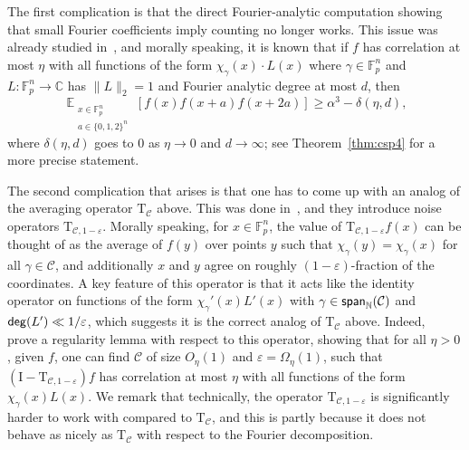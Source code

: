 \documentclass[11pt]{article}
\newcommand\norm[1]{\| #1 \|}
\newcommand\Expect[2]{{\mathop{\mathbb{E}}_{#1}\left[ {#2} \right]}}
\newcommand\spn{{\sf span}_{\mathbb{N}}}
\newcommand\eps{\varepsilon}
\renewcommand\geq{\geqslant}
\begin{document}
The first complication is that the direct Fourier-analytic computation showing that small Fourier coefficients imply counting no longer works.
This issue was already studied in~\cite{BKM3AP,BKM4}, and morally speaking, it is known that if $f$ has correlation at most $\eta$ with all functions of the form $\chi_{\gamma}(x)\cdot L(x)$ 
where $\gamma\in\mathbb{F}_p^n$ and $L\colon \mathbb{F}_p^n\to\mathbb{C}$ has $\norm{L}_2=1$ and Fourier analytic degree at most $d$, then
\[
\Expect{\substack{x\in\mathbb{F}_p^n\\a\in\{0,1,2\}^n}}{f(x)f(x+a)f(x+2a)}
\geq \alpha^3 - \delta(\eta,d),
\]
where $\delta(\eta,d)$ goes to $0$ as $\eta\rightarrow 0$ and $d\rightarrow \infty$; see Theorem~\ref{thm:csp4} for a more precise statement. 


The second complication that arises is that one has to come up with an analog of the averaging operator $\mathrm{T}_{\mathcal{C}}$ above. This was done in~\cite{BKM5}, and they introduce noise operators $\mathrm{T}_{\mathcal{C},1-\eps}$. Morally speaking, for $x\in\mathbb{F}_p^n$, the value of $\mathrm{T}_{\mathcal{C},1-\eps}f(x)$ can be thought of as the average of $f(y)$ over points $y$ such that $\chi_{\gamma}(y) = \chi_{\gamma}(x)$ for all $\gamma\in\mathcal{C}$, and additionally $x$ and $y$ agree on roughly $(1-\eps)$-fraction of the coordinates. A key feature of this  operator is that it acts like the identity operator on functions of the form $\chi_{\gamma}'(x) L'(x)$ with $\gamma\in \spn(\mathcal{C})$ and ${\sf deg}(L')\ll 1/\eps$, which suggests it is the correct analog of $\mathrm{T}_{\mathcal{C}}$ above. Indeed,~\cite{BKM5} prove a regularity lemma with respect to this operator, showing that for all $\eta>0$, given $f$, one can find 
$\mathcal{C}$ of size $O_{\eta}(1)$ and $\eps = \Omega_{\eta}(1)$, such that 
$(\mathrm{I}-\mathrm{T}_{\mathcal{C},1-\eps})f$ has correlation at most $\eta$ with all functions of the form $\chi_{\gamma}(x) L(x)$. We remark that technically, the operator $\mathrm{T}_{\mathcal{C},1-\eps}$ is significantly harder to work with compared to $\mathrm{T}_{\mathcal{C}}$, and this is partly because it does not behave as nicely as $\mathrm{T}_{\mathcal{C}}$ with respect to the Fourier decomposition.
\end{document}
